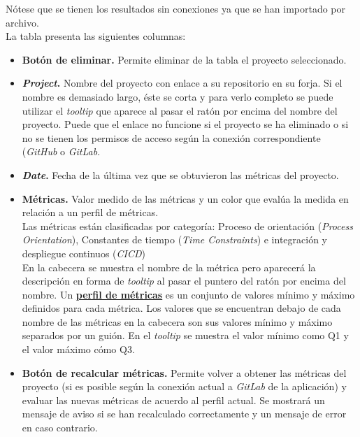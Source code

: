 Nótese que se tienen los resultados sin conexiones ya que se han importado por archivo.\\
La tabla presenta las siguientes columnas:
\begin{itemize}
	\item \textbf{Botón de eliminar.} Permite eliminar de la tabla el proyecto seleccionado.
	
	\item \textbf{\textit{Project}.} Nombre del proyecto con enlace a su repositorio en su forja. Si el nombre es demasiado largo, éste se corta y para verlo completo se puede utilizar el \textit{tooltip} que aparece al pasar el ratón por encima del nombre del proyecto. Puede que el enlace no funcione si el proyecto se ha eliminado o si no se tienen los permisos de acceso según la conexión correspondiente (\textit{GitHub} o \textit{GitLab}.
	
	\item \textbf{\textit{Date}.} Fecha de la última vez que se obtuvieron las métricas del proyecto.
	
	\item \textbf{Métricas.} Valor medido de las métricas y un color que evalúa la medida en relación a un perfil de métricas.\\
	Las métricas están clasificadas por categoría: Proceso de orientación (\textit{Process Orientation}), Constantes de tiempo (\textit{Time Constraints}) e integración y despliegue continuos (\textit{CICD})\\
	En la cabecera se muestra el nombre de la métrica pero aparecerá la descripción en forma de \textit{tooltip} al pasar el puntero del ratón por encima del nombre.
	Un \textbf{\underline{perfil de métricas}} es un conjunto de valores mínimo y máximo definidos para cada métrica. Los valores que se encuentran debajo de cada nombre de las métricas en la cabecera son sus valores mínimo y máximo separados por un guión. En el \textit{tooltip} se muestra el valor mínimo como Q1 y el valor máximo cómo Q3.
	
	\item \textbf{Botón de recalcular métricas.} Permite volver a obtener las métricas del proyecto (si es posible según la conexión actual a \textit{GitLab} de la aplicación) y evaluar las nuevas métricas de acuerdo al perfil actual. Se mostrará un mensaje de aviso si se han recalculado correctamente y un mensaje de error en caso contrario.
\end{itemize}


